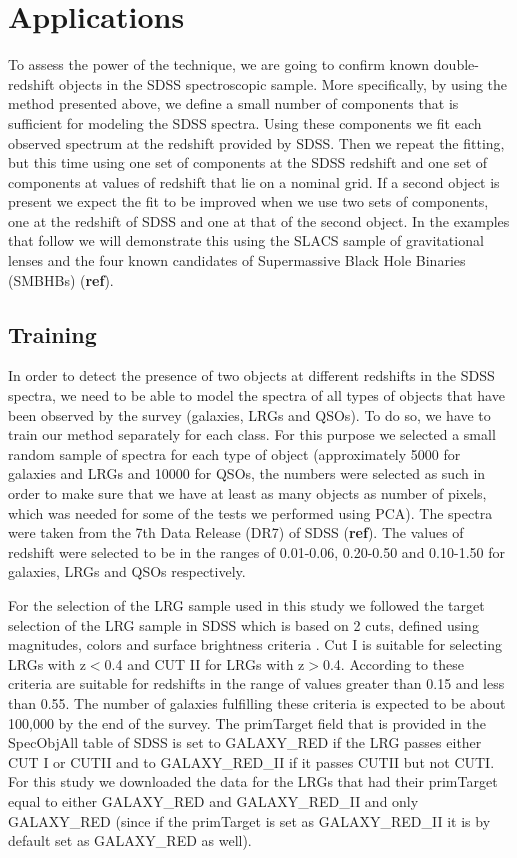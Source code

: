 \documentclass[12pt,preprint]{aastex}
\begin{document}
\section{Applications}\label{applications}
To assess the power of the technique, we are going to confirm known
double-redshift objects in the SDSS spectroscopic sample. More
specifically, by using the method presented above, we define a small
number of components that is sufficient for modeling the SDSS
spectra. Using these components we fit each observed spectrum at the
redshift provided by SDSS. Then we repeat the fitting, but this time
using one set of components at the SDSS redshift and one set of
components at values of redshift that lie on a nominal grid. If a
second object is present we expect the fit to be improved when we use
two sets of components, one at the redshift of SDSS and one at that of
the second object. In the examples that follow we will demonstrate
this using the SLACS sample of gravitational lenses \citep{bolton} and
the four known candidates of Supermassive Black Hole Binaries (SMBHBs)
(\textbf{ref}).

\subsection{Training}\label{training}
In order to detect the presence of two objects at different redshifts in the SDSS spectra, we need to be able to model the spectra of all types of objects that have been observed by the survey (galaxies, LRGs and QSOs). To do so, we have to train our method separately for each class. For this purpose we selected a small random sample of spectra for each type of object (approximately 5000 for galaxies and LRGs and 10000 for QSOs, the numbers were selected as such in order to make sure that we have at least as many objects as number of pixels, which was needed for some of the tests we performed using PCA). The spectra were taken from the 7th Data Release (DR7) of SDSS (\textbf{ref}). The values of redshift were selected to be in the ranges of  0.01-0.06, 0.20-0.50 and 0.10-1.50 for galaxies, LRGs and QSOs respectively.

For the selection of the LRG sample used in this study we followed the
target selection of the LRG sample in SDSS which is based on 2 cuts,
defined using magnitudes, colors and surface brightness criteria
\citep{eisenstein}. Cut I is suitable for selecting LRGs with z$<$0.4
and CUT II for LRGs with z$>$0.4. According to \cite{eisenstein} these
criteria are suitable for redshifts in the range of values greater
than 0.15 and less than 0.55. The number of galaxies fulfilling these
criteria is expected to be about 100,000 by the end of the survey. The
primTarget field that is provided in the SpecObjAll table of SDSS is
set to GALAXY\_RED if the LRG passes either CUT I or CUTII and to
GALAXY\_RED\_II if it passes CUTII but not CUTI. For this study we
downloaded the data for the LRGs that had their primTarget equal to
either GALAXY\_RED and GALAXY\_RED\_II and only GALAXY\_RED (since if
the primTarget is set as GALAXY\_RED\_II it is by default set as
GALAXY\_RED as well).
\end{document}
